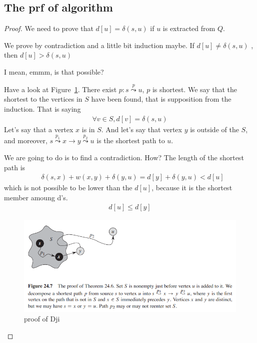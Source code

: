 \documentclass[a4paper, 10pt]{ctexart} %
\begin{document}
\subsection{The prf of algorithm}
\begin{proof}
We need to prove that 
$d\left[ u   \right] = \delta \left(s, u\right)$ if $u $ is extracted 
from $Q$.

We prove by contradiction and a 
little bit induction maybe. 
If $d[u]\ne \delta \left( s, u\right) $ ,
then $d[ u]  > \delta \left( s, u\right)$

I mean, emmm, is that possible? 

Have a look at Figure~\ref{fig:prfofdij}. 
There exist $p: s \overset{p}{\leadsto} u$, $p$ is shortest. 
We say that the shortest 
to the vertices in $S$ have
been found, that is supposition from the 
induction. That is saying
\begin{align*}
    \forall  v \in S , d[v]  = \delta \left( s , u\right)
\end{align*}
Let's say that a vertex $x$ is in $S$. And let's say that 
vertex $y$ is outside of the $S$, and moreover,
$s \overset{p_{1}}{\leadsto} x \to y \overset{p_{2}}{\leadsto} u$ 
is the shortest path to $u$. 

We are going to do is to find a contradiction. How? 
The length of the shortest path is 
\begin{align*}
&     \delta \left(s , x\right)   + w\left( x,  y\right) + \delta \left( y , u\right)
= d\left[y\right] + \delta \left( y  , u\right) < d[u]
\end{align*}
which is not possible to be lower than the 
$d[u]$, because it is the shortest member amoung d's.
\begin{align*}
    d\left[ u \right] \le d[y   ]
\end{align*}
\begin{figure}[]
    \centering
    \includegraphics[scale = 0.6]{sssp9.png}
    \caption{proof of Dji}
    \label{fig:prfofdij}
\end{figure}
\end{proof}
\end{document}
